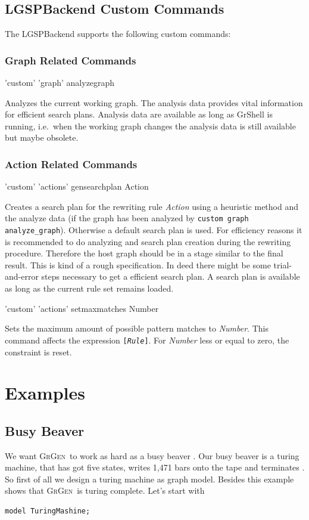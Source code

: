 \documentclass[a4paper,11pt]{report}
\providecommand{\GrG}{{\scshape GrGen}}
\begin{document}
\section{LGSPBackend Custom Commands}
\label{custom}
The LGSPBackend supports the following custom commands:

\subsection{Graph Related Commands}
\begin{rail}
  'custom' 'graph' analyzegraph
\end{rail}
Analyzes the current working graph. The analysis data provides vital information for efficient search plans. Analysis data are available as long as GrShell is running, i.e.\ when the working graph changes the analysis data is still available but maybe obsolete.

\subsection{Action Related Commands}
\begin{rail}
  'custom' 'actions' gensearchplan Action
\end{rail}
Creates a search plan for the rewriting rule \emph{Action} using a heuristic method and the analyze data (if the graph has been analyzed by \texttt{custom graph analyze\_graph}). Otherwise a default search plan is used. For efficiency reasons it is recommended to do analyzing and search plan creation during the rewriting procedure. Therefore the host graph should be in a stage similar to the final result. This is kind of a rough specification. In deed there might be some trial-and-error steps necessary to get a efficient search plan. A search plan is available as long as the current rule set remains loaded. 

\begin{rail}
  'custom' 'actions' setmaxmatches Number
\end{rail}
Sets the maximum amount of possible pattern matches to \emph{Number}. This command affects the expression \texttt{[\emph{Rule}]}. For \emph{Number} less or equal to zero, the constraint is reset.

\chapter{Examples}
\label{anexample}
\section{Busy Beaver}
We want \GrG\ to work as hard as a busy beaver \cite{kroll, bb}. Our busy beaver is a turing machine, that has got five states, writes 1,471 bars onto the tape and terminates \cite{beaver}. So first of all we design a turing machine as graph model. Besides this example shows that \GrG\ is turing complete. Let's start with
\lstset{language=grgenmodel}
\begin{lstlisting}[name=gr]
model TuringMashine;
\end{lstlisting}
\end{document}

